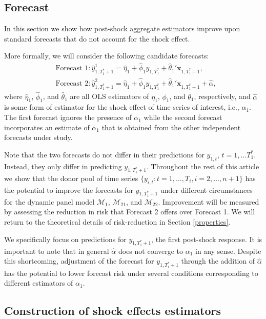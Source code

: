 \documentclass[11pt,3p,review,authoryear]{elsarticle}
\newcommand{\x}{\textbf{x}}
\def\mc#1{\mathcal{#1}} %
\theoremstyle{definition}
\begin{document}
\subsection{Forecast}
\label{forecast}
In this section we show how post-shock aggregate estimators improve upon standard 
forecasts that do not account for the shock effect.

More formally, we will consider the following candidate forecasts: 
\begin{align*}
  &\text{Forecast 1}: \hat y_{1,T_1^*+1}^1 = \hat\eta_1 
    + \hat\phi_1 y_{1,T_1^*} + \hat\theta_1'\x_{1,T_1^*+1} 
    , \\
  &\text{Forecast 2}: \hat y_{1,T_1^*+1}^2 = \hat\eta_1 
    + \hat\phi_1 y_{1,T_1^*} + \hat\theta_1'\x_{1,T_1^*+1} 
    + \hat{\alpha},
\end{align*}
where $\hat\eta_1$, $\hat\phi_1$, and $\hat\theta_1$ are all OLS estimators of $\eta_1$, $\phi_1$, and $\theta_1$, respectively, and $\hat{\alpha}$ is some form of estimator for the shock effect of time series of interest, i.e., $\alpha_1$. 
The first forecast ignores the presence of $\alpha_1$ while the second forecast 
incorporates an estimate of $\alpha_1$ that is obtained from the other independent forecasts under study. 

Note that the two forecasts do not differ in their predictions for 
$y_{1,t}$, $t = 1,\ldots T_1^*$. Instead, they only differ in predicting 
$y_{1,T_1^*+1}$. Throughout the rest of this article we show that the donor pool of time series $\{y_{i,t} \colon t = 1,\ldots,T_i, i = 2,\ldots,n+1\}$ has 
the potential to improve the forecasts for $y_{1, T_1^*+1}$ under  different 
circumstances for the dynamic panel model $\mc{M}_1$, $\mc{M}_{21}$, and $\mc{M}_{22}$. Improvement will be measured by assessing the reduction in risk that Forecast 2 offers over Forecast 1. We will return to the theoretical details of risk-reduction in Section \ref{properties}.

We specifically focus on predictions for $y_{1,T_1^*+1}$, the first post-shock response. It is important to note that in general $\hat{\alpha}$ does not converge to $\alpha_1$ in any sense.  Despite this shortcoming, adjustment of the forecast for $y_{1,T_1^*+1}$ through the addition of $\hat{\alpha}$ has the potential to lower forecast risk under several conditions corresponding to different estimators of $\alpha_1$.


\subsection{Construction of shock effects estimators}
\label{constructionofestimators}
\end{document}
